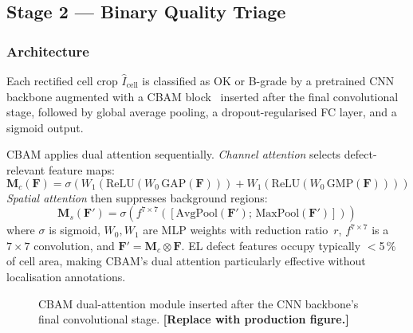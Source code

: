 \documentclass[conference]{IEEEtran}
\begin{document}
\subsection{Stage 2 --- Binary Quality Triage}
\label{sec:stage2}

\subsubsection{Architecture}

Each rectified cell crop $\hat{I}_{\text{cell}}$ is
classified as OK or B-grade by a pretrained CNN backbone
augmented with a CBAM block~\cite{woo2018} inserted after
the final convolutional stage, followed by global average
pooling, a dropout-regularised FC layer, and a sigmoid output.

CBAM applies dual attention sequentially.
\textit{Channel attention} selects defect-relevant feature maps:
\begin{equation}
  \mathbf{M}_c(\mathbf{F}) = \sigma\!\left(
    W_1\!\left(\text{ReLU}\!\left(W_0\,\text{GAP}(\mathbf{F})\right)\right) +
    W_1\!\left(\text{ReLU}\!\left(W_0\,\text{GMP}(\mathbf{F})\right)\right)
  \right)
  \label{eq:cbam_ch}
\end{equation}
\textit{Spatial attention} then suppresses background regions:
\begin{equation}
  \mathbf{M}_s(\mathbf{F}') = \sigma\!\left(
    f^{7\times7}\!\!\left(
      \left[\text{AvgPool}(\mathbf{F}');\,\text{MaxPool}(\mathbf{F}')\right]
    \right)\right)
  \label{eq:cbam_sp}
\end{equation}
where $\sigma$ is sigmoid, $W_0, W_1$ are MLP weights with
reduction ratio~$r$, $f^{7\times7}$ is a $7{\times}7$
convolution, and $\mathbf{F}' = \mathbf{M}_c \otimes \mathbf{F}$.
EL defect features occupy typically $<$5\,\% of cell area,
making CBAM's dual attention particularly effective without
localisation annotations.

\begin{figure}[t]
  \centering
  \caption{CBAM dual-attention module inserted after the
           CNN backbone's final convolutional stage.
           \textbf{[Replace with production figure.]}
           }
  \label{fig:cbam_arch}
\end{figure}
\end{document}
